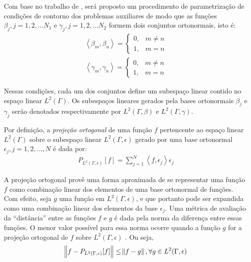 Com base no trabalho de \cite{artigo_padilha_3}, será proposto um procedimento de parametrização de condições de contorno dos problemas auxiliares de modo que as funções
$\beta_j, j=1,2,\ldots N_1$ e $\gamma_j, j=1,2,\ldots N_2$ formem dois conjuntos ortonormais, isto é:
\begin{align}
	\left\langle  \beta_m, \beta_n \right\rangle = \left\lbrace
		\begin{matrix}
		0, & m \neq n \\
		1, & m = n 
		\end{matrix}
	\right.
\end{align}
\begin{align}
	\left\langle  \gamma_m, \gamma_n \right\rangle = \left\lbrace
		\begin{matrix}
		0, & m \neq n \\
		1, & m = n 
		\end{matrix}
	\right.
\end{align}

Nessas condições, cada um dos conjuntos define um subespaço linear contido no espaço linear $L^2(\Gamma)$. Os subespaços lineares gerados pela bases
ortonormais $\beta_j$ e $\gamma_j$ serão denotados respectivamente por $L^2(\Gamma, \beta)$ e $L^2(\Gamma, \gamma)$.

Por definição, a \textit{projeção ortogonal} de uma função $f$ pertencente ao espaço linear $L^2(\Gamma)$ sobre o subespaço linear $L^2(\Gamma, \epsilon)$
gerado por uma base ortonormal $\epsilon_j, j=1,2,\ldots,N$ é dada por:
\begin{align}
	P_{L^2(\Gamma, \epsilon)}[f] = \sum_{j=1}^N \left\langle f, \epsilon_j \right\rangle \epsilon_j
\end{align}

A projeção ortogonal provê uma forma aproximada de se representar uma função $f$ como combinação linear dos elementos de uma base ortonormal de
funções. Com efeito, seja $g$ uma função em $L^2(\Gamma, \epsilon)$, e que portanto pode ser expandida como uma combinação linear dos elementos da base $\epsilon_j$. Uma métrica de
avaliação da ``distância'' entre as funções $f$ e $g$ é dada pela norma da diferença entre essas funções. O menor valor possível para essa norma ocorre
quando a função $g$ for a projeção ortogonal de $f$ sobre $L^2(\Gamma, \epsilon)$ \citep{livro_axler}. Ou seja,
\begin{align}
	\norm{f - P_{L^2(\Gamma, \epsilon)}[f]} \le \norm{f - g}, \forall g \in L^2(\Gamma, \epsilon)
\end{align}

